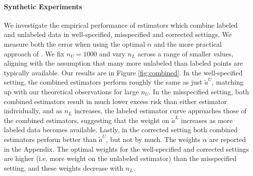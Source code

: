 

\vspace{-0.5em}
\paragraph{Synthetic Experiments} We investigate the empirical performance of estimators which combine labeled and unlabeled data in well-specified, misspecified and corrected settings. We measure both the error when using the optimal $\alpha$ and the more practical approach of \cite{GreenStrawderman2001}. We fix $n_U=1000$ and vary $n_L$ across a range of smaller values, aligning with the assumption that many more unlabeled than labeled points are typically available. Our results are in Figure \ref{fig:combined}. In the well-specified setting, the combined estimators perform roughly the same as just $\widetilde{a}^U$, matching up with our theoretical observations for large $n_U$. In the misspecified setting, both combined estimators result in much lower excess risk than either estimator individually, and as $n_L$ increases, the labeled estimator curve approaches those of the combined estimators, suggesting that the weight on $\widetilde{a}^L$ increases as more labeled data becomes available. Lastly, in the corrected setting both combined estimators perform better than $\widetilde{a}^U$, but not by much.
The weights $\alpha$ are reported in the Appendix. The optimal weights for the well-specified and corrected settings are higher (i.e. more weight on the unlabeled estimator) than the misspecified setting, and these weights decrease with $n_L$.


